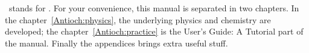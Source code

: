 \Antioch\ stands for \ANTIOCH. For your convenience,
this manual is separated in two chapters. In the
chapter~\ref{Antioch:physics}, the underlying physics
and chemistry are developed; 
the chapter~\ref{Antioch:practice}
is the \textsf{User's Guide: A Tutorial} part of the manual. Finally
the appendices brings extra useful stuff.
